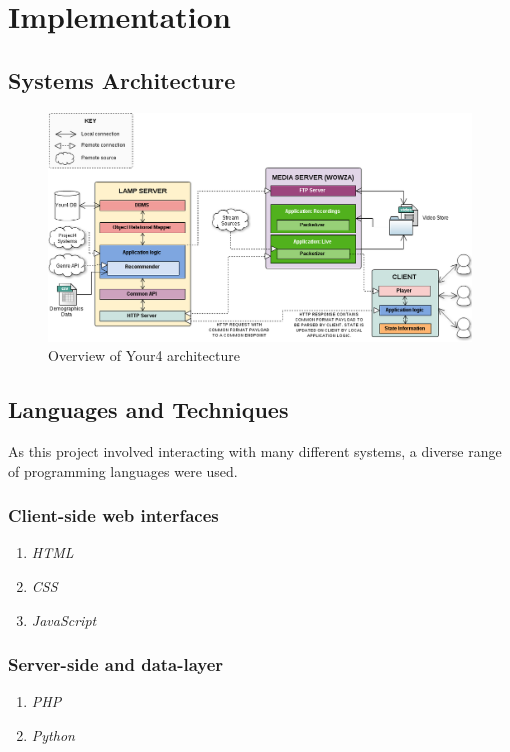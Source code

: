 \section{Implementation}

\subsection{Systems Architecture}

\begin{figure}[H]
	\centering
	\includegraphics[scale=0.4]{resources/your4-architecture.png}
	\caption{Overview of Your4 architecture}
	\label{your4-architecture}
\end{figure}


\subsection{Languages and Techniques}
As this project involved interacting with many different systems, a diverse range of programming languages were used.

\subsubsection{Client-side web interfaces}
\begin{enumerate}
\item \textit{HTML}
\item \textit{CSS}
\item \textit{JavaScript}
\end{enumerate}

\subsubsection{Server-side and data-layer}
\begin{enumerate}
\item \textit{PHP}
\item \textit{Python}
\end{enumerate}

